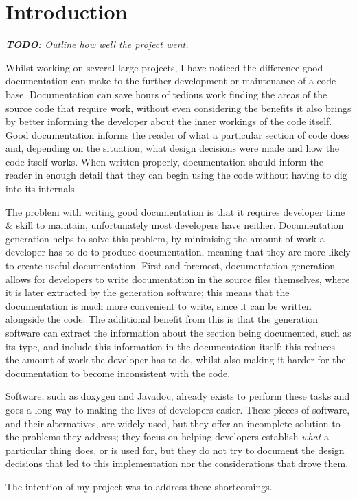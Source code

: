 
\chapter{Introduction}

\emph{\textbf{TODO:} Outline how well the project went.}

Whilst working on several large projects, I have noticed the difference good
documentation can make to the further development or maintenance of a code base.
Documentation can save hours of tedious work finding the areas of the source
code that require work, without even considering the benefits it also brings by
better informing the developer about the inner workings of the code itself. Good
documentation informs the reader of what a particular section of code does and,
depending on the situation, what design decisions were made and how the code
itself works. When written properly, documentation should inform the reader in
enough detail that they can begin using the code without having to dig into its
internals.

The problem with writing good documentation is that it requires developer time
\& skill to maintain, unfortunately most developers have neither. Documentation
generation helps to solve this problem, by minimising the amount of work a
developer has to do to produce documentation, meaning that they are more likely
to create useful documentation. First and foremost, documentation generation
allows for developers to write documentation in the source files themselves,
where it is later extracted by the generation software; this means that the
documentation is much more convenient to write, since it can be written
alongside the code. The additional benefit from this is that the generation
software can extract the information about the section being documented, such as
its type, and include this information in the documentation itself; this reduces
the amount of work the developer has to do, whilst also making it harder for the
documentation to become inconsistent with the code.

Software, such as doxygen\cite{website:doxygen} and
Javadoc\cite{website:javadoc}, already exists to perform these tasks and goes a
long way to making the lives of developers easier. These pieces of software, and
their alternatives, are widely used, but they offer an incomplete solution to
the problems they address; they focus on helping developers establish
\emph{what} a particular thing does, or is used for, but they do not try to
document the design decisions that led to this implementation nor the
considerations that drove them.

The intention of my project was to address these shortcomings.
